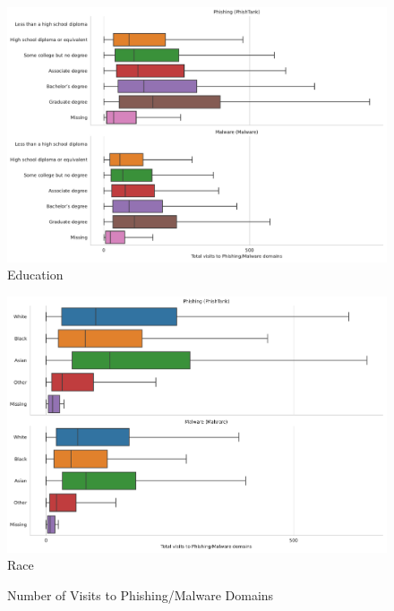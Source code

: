 \documentclass[12pt, letterpaper]{article}
\begin{document}
\begin{figure}[!htb]
\centering
\caption{Number of Visits to Phishing/Malware Domains}\label{fig:total_visits_phishing_malware}
	\begin{minipage}[b]{0.32\textwidth}
	\centering
	\label{fig:total_visits_phishing_malware_educ}
	\includegraphics[width=\textwidth]{figs/total_visits_phishing_malware_educ.pdf}\\Education
	\end{minipage}
	\begin{minipage}[b]{0.32\textwidth}
	\centering
	\label{fig:total_visits_phishing_malware_race}
	\includegraphics[width=\textwidth]{figs/total_visits_phishing_malware_race.pdf}\\Race
	\end{minipage}
	\begin{minipage}[b]{0.32\textwidth}
	\centering
	\label{fig:total_visits_phishing_malware_age}

\end{minipage}
\end{figure}
\end{document}
